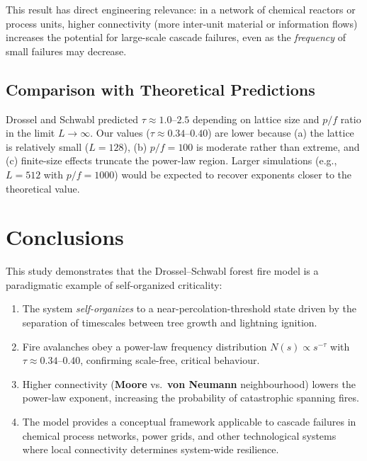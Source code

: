 \documentclass[12pt,a4paper]{article}
\begin{document}
This result has direct engineering relevance: in a network of chemical
reactors or process units, higher connectivity (more inter-unit material
or information flows) increases the potential for large-scale cascade
failures, even as the \emph{frequency} of small failures may decrease.

\subsection{Comparison with Theoretical Predictions}

Drossel and Schwabl \cite{drossel1992} predicted $\tau \approx 1.0$--$2.5$
depending on lattice size and $p/f$ ratio in the limit $L\to\infty$.
Our values ($\tau \approx 0.34$--$0.40$) are lower because (a) the lattice
is relatively small ($L=128$), (b) $p/f = 100$ is moderate rather than
extreme, and (c) finite-size effects truncate the power-law region.
Larger simulations (e.g., $L = 512$ with $p/f = 1000$) would be expected
to recover exponents closer to the theoretical value.

\section{Conclusions}
\label{sec:conclusions}

This study demonstrates that the Drossel--Schwabl forest fire model is a
paradigmatic example of self-organized criticality:

\begin{enumerate}
  \item The system \emph{self-organizes} to a near-percolation-threshold
        state driven by the separation of timescales between tree growth
        and lightning ignition.

  \item Fire avalanches obey a power-law frequency distribution
        $N(s)\propto s^{-\tau}$ with $\tau \approx 0.34$--$0.40$,
        confirming scale-free, critical behaviour.

  \item Higher connectivity (\textbf{Moore} vs.\ \textbf{von Neumann}
        neighbourhood) lowers the power-law exponent, increasing the
        probability of catastrophic spanning fires.

  \item The model provides a conceptual framework applicable to cascade
        failures in chemical process networks, power grids, and other
        technological systems where local connectivity determines
        system-wide resilience.
\end{enumerate}
\end{document}

